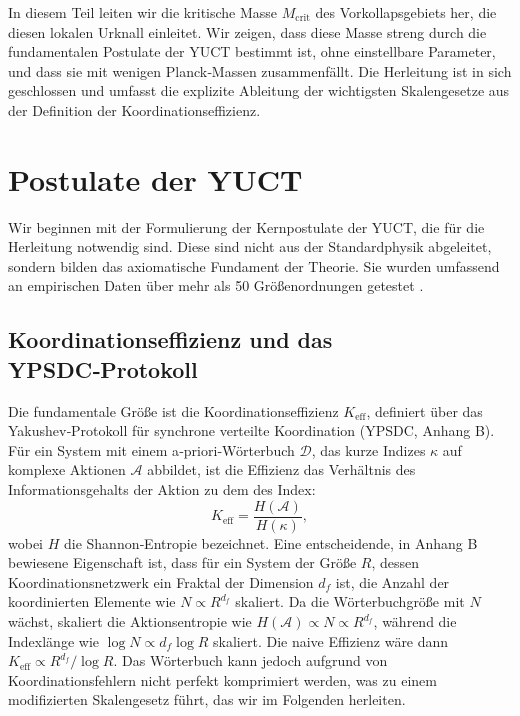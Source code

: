 \documentclass[11pt,a4paper]{article}
\newcommand{\Keff}{K_{\mathrm{eff}}}
\begin{document}
	In diesem Teil leiten wir die kritische Masse \(M_{\mathrm{crit}}\) des Vorkollapsgebiets her, die diesen lokalen Urknall einleitet. Wir zeigen, dass diese Masse streng durch die fundamentalen Postulate der YUCT bestimmt ist, ohne einstellbare Parameter, und dass sie mit wenigen Planck‑Massen zusammenfällt. Die Herleitung ist in sich geschlossen und umfasst die explizite Ableitung der wichtigsten Skalengesetze aus der Definition der Koordinationseffizienz.
	
	\section{Postulate der YUCT}
	
	Wir beginnen mit der Formulierung der Kernpostulate der YUCT, die für die Herleitung notwendig sind. Diese sind nicht aus der Standardphysik abgeleitet, sondern bilden das axiomatische Fundament der Theorie. Sie wurden umfassend an empirischen Daten über mehr als 50 Größenordnungen getestet \cite{AppendixL}.
	
	\subsection{Koordinationseffizienz und das YPSDC‑Protokoll}
	
	Die fundamentale Größe ist die Koordinationseffizienz \(K_{\mathrm{eff}}\), definiert über das Yakushev‑Protokoll für synchrone verteilte Koordination (YPSDC, Anhang B). Für ein System mit einem a‑priori‑Wörterbuch \(\mathcal{D}\), das kurze Indizes \(\kappa\) auf komplexe Aktionen \(\mathcal{A}\) abbildet, ist die Effizienz das Verhältnis des Informationsgehalts der Aktion zu dem des Index:
	\begin{equation}
		\Keff = \frac{H(\mathcal{A})}{H(\kappa)},
		\label{eq:keff-def}
	\end{equation}
	wobei \(H\) die Shannon‑Entropie bezeichnet. Eine entscheidende, in Anhang B bewiesene Eigenschaft ist, dass für ein System der Größe \(R\), dessen Koordinationsnetzwerk ein Fraktal der Dimension \(d_f\) ist, die Anzahl der koordinierten Elemente wie \(N \propto R^{d_f}\) skaliert. Da die Wörterbuchgröße mit \(N\) wächst, skaliert die Aktionsentropie wie \(H(\mathcal{A}) \propto N \propto R^{d_f}\), während die Indexlänge wie \(\log N \propto d_f \log R\) skaliert. Die naive Effizienz wäre dann \(\Keff \propto R^{d_f} / \log R\). Das Wörterbuch kann jedoch aufgrund von Koordinationsfehlern nicht perfekt komprimiert werden, was zu einem modifizierten Skalengesetz führt, das wir im Folgenden herleiten.
	
\end{document}
